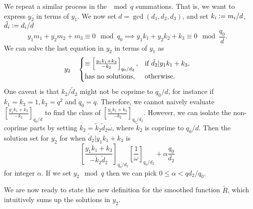 We repeat a similar process in the $\mod q$ summations. That is, we want to express $y_2$ in terms of $y_1$. 
We now set $d=\gcd(d_1,d_2,d_3)$, and set $k_i \mathrel{\mathop:}= m_i/d$, $\tilde{d}_i\mathrel{\mathop:}= d_i/d$ \[
y_1m_1+y_2m_2+m_3\equiv 0 \mod q_0 \implies y_1k_1+y_2k_2 + k_3 \equiv 0 \mod \frac{q_0}{d}.
\]
We can solve the last equation in $y_2$ in terms of $y_1$ as \[
y_2 \quad \begin{cases}
     \equiv \left[\frac{y_1k_1+k_3}{-k_2}\right]_{q_0/d_2} , & \textrm{if $\tilde{d_2}|y_1k_1+k_3$}, \\
      \textrm{has no solutions}, & \rm{otherwise}.
\end{cases}
\]
One caveat is that $k_2/\tilde{d}_2$ might not be coprime to $q_0/d$, for instance if $k_1=k_3=1,k_2=q^2$ and $q_0=q$. Therefore, we cannot naively evaluate $\left[\frac{y_1k_1+k_3}{-k_2}\right]_{q_0/d}$ to find the class of $\left[\frac{y_1k_1+k_3}{-k_2}\right]_{q_0/d_2}$. However, we can isolate the 
non-coprime parts by setting $k_2 = \tilde{k}_2 \tilde{d}_2 \omega$, where $\tilde{k}_2$ is coprime to $q_0/d$. Then the solution set for $y_2$ for when $\tilde{d}_2|y_1k_1+k_3$ is \[
    \left[\frac{y_1k_1+k_3}{-\tilde{k}_2\tilde{d}_2}\right]_{q_0/d_2}\left[\frac{1}{\omega}\right]_{q_0/d_2}+ \alpha \frac{q_0}{d_2}
\]
for integer $\alpha$. If we set $y_2\mod q$ then we can pick $0\leq \alpha < qd_2/q_0 $.


We are now ready to state the new definition for the smoothed function $\tilde{R}$, which intuitively sums up the solutions in $y_2$.

